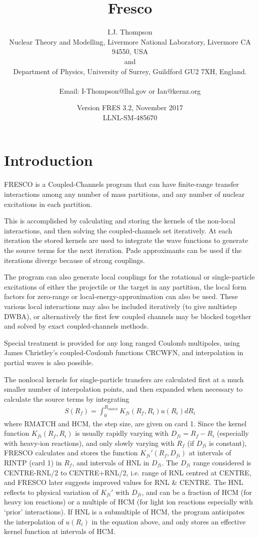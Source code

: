 \documentclass[11pt]{article}
\title{\Huge Fresco}
\date{Version FRES 3.2, November 2017\\  LLNL-SM-485670}
\author{I.J. Thompson\\
%
Nuclear Theory and Modelling, Livermore National Laboratory, Livermore CA 94550, USA\\
and 
\\Department of Physics, University of Surrey, Guildford GU2 7XH, England.
\\ %
\\Email:  I-Thompson@llnl.gov  or Ian@kernz.org}
\newcommand{\beqn}{\begin{eqnarray*}}
\newcommand{\eeqn}{\end{eqnarray*}}
\begin{document}
\maketitle
\section{Introduction}

{\large
\parskip 5pt
\parindent 10pt

FRESCO is a Coupled-Channels program that can have finite-range
transfer interactions among any number of mass partitions, and any
number of nuclear excitations in each partition.

This is accomplished by calculating and storing the kernels of the
non-local interactions, and then solving the coupled-channels set
iteratively.
At each iteration the stored kernels are used to integrate the wave
functions to generate the source terms for the next iteration.
Pade approximants can be used if the iterations diverge because of
strong couplings.

The program can also generate local couplings for the rotational
or single-particle excitations of either the projectile or the
target in any partition,
the local form factors for zero-range or local-energy-approximation
can also be used.
These various local interactions may also be included iteratively
(to give multistep DWBA), or alternatively the first few coupled
channels may be blocked together and solved by exact coupled-channels
methods.

Special treatment is provided for any long ranged Coulomb multipoles,
using James Christley's coupled-Coulomb functions CRCWFN,
and interpolation in partial waves is also possible.

The nonlocal kernels for single-particle transfers are calculated first
at a much smaller number of interpolation points,
and then expanded when necessary to calculate the source terms by
integrating
\beqn
S(R _ f ) = \int _ 0 ^ {R _ {match}}
                K _ {fi} (R _ f , R _ i ) u(R _ i ) dR _ i
\eeqn
where RMATCH and HCM, the step size, are given on card 1.
Since the kernel function $K_{fi}(R_f,R_i)$ is usually rapidly varying with
$D_{fi} = R_{f} - R_{i}$ (especially with heavy-ion reactions), and only slowly
varying with $R_{f}$ (if $D_{fi}$ is constant),  FRESCO calculates and stores
the function $K_{fi}'(R_{f},D_{fi})$ at intervals of RINTP (card 1) in $R_{f}$,
and intervals of HNL in $D_{fi}$. The $D_{fi}$ range considered is
CENTRE-RNL/2 to CENTRE+RNL/2, i.e. range of RNL centred at CENTRE,
and FRESCO later suggests improved values for RNL \& CENTRE.
The HNL reflects to physical variation of $K_{fi}'$ with $D_{fi}$, and can be
a fraction of HCM (for heavy ion reactions) or a multiple of HCM
(for light ion reactions especially with `prior' interactions).
If HNL is a submultiple of HCM, the program anticipates the interpolation
of $u(R_{i})$ in the equation above, and only stores an effective kernel
function at intervals of HCM.

}
\end{document}
